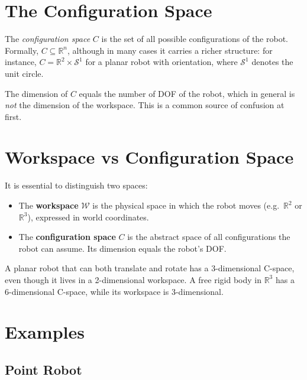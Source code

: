 \section{The Configuration Space}
\label{sec:cspace-definition}

\begin{definition}
The \emph{configuration space} \( C \) is the set of all possible
configurations of the robot. Formally, \( C \subseteq \mathbb{R}^n \),
although in many cases it carries a richer structure: for instance,
\( C = \mathbb{R}^2 \times \mathcal{S}^1 \) for a planar robot with
orientation, where \( \mathcal{S}^1 \) denotes the unit circle.
\end{definition}

The dimension of \( C \) equals the number of DOF of the robot, which
in general is \emph{not} the dimension of the workspace. This is a
common source of confusion at first.

\section{Workspace vs Configuration Space}
\label{sec:workspace-vs-cspace}

It is essential to distinguish two spaces:

\begin{itemize}
    \item The \textbf{workspace} \( \mathcal{W} \) is the physical space
          in which the robot moves (e.g.\ \( \mathbb{R}^2 \) or
          \( \mathbb{R}^3 \)), expressed in world coordinates.
    \item The \textbf{configuration space} \( C \) is the abstract space
          of all configurations the robot can assume. Its dimension
          equals the robot's DOF.
\end{itemize}

A planar robot that can both translate and rotate has a 3-dimensional
C-space, even though it lives in a 2-dimensional workspace. A free
rigid body in \( \mathbb{R}^3 \) has a 6-dimensional C-space, while
its workspace is 3-dimensional.

\section{Examples}
\label{sec:cspace-examples}

\subsection{Point Robot}
\label{subsec:point-robot}

